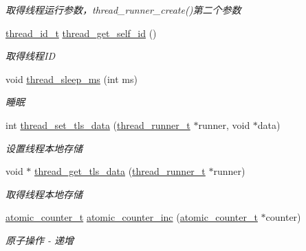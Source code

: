 \begin{DoxyCompactItemize}
\begin{DoxyCompactList}\small\item\em 取得线程运行参数，thread\+\_\+runner\+\_\+create()第二个参数 \end{DoxyCompactList}\item 
\hyperlink{a00050_ad0ada5642d10ce71bdd90816182f9b79_ad0ada5642d10ce71bdd90816182f9b79}{thread\+\_\+id\+\_\+t} \hyperlink{a00107_gaecf10907eee00ec0e807271c906a6645_gaecf10907eee00ec0e807271c906a6645}{thread\+\_\+get\+\_\+self\+\_\+id} ()
\begin{DoxyCompactList}\small\item\em 取得线程\+I\+D \end{DoxyCompactList}\item 
void \hyperlink{a00107_gabddf3ac30aac3f22f8c53b7517e6eb35_gabddf3ac30aac3f22f8c53b7517e6eb35}{thread\+\_\+sleep\+\_\+ms} (int ms)
\begin{DoxyCompactList}\small\item\em 睡眠 \end{DoxyCompactList}\item 
int \hyperlink{a00107_gaa187b2cd2c906680890fb4ea2833d665_gaa187b2cd2c906680890fb4ea2833d665}{thread\+\_\+set\+\_\+tls\+\_\+data} (\hyperlink{a00050_a9054159cde2f926ef61c28ce1e555199_a9054159cde2f926ef61c28ce1e555199}{thread\+\_\+runner\+\_\+t} $\ast$runner, void $\ast$data)
\begin{DoxyCompactList}\small\item\em 设置线程本地存储 \end{DoxyCompactList}\item 
void $\ast$ \hyperlink{a00107_ga63c9be5b8fb04c0b26382f51b7bdf237_ga63c9be5b8fb04c0b26382f51b7bdf237}{thread\+\_\+get\+\_\+tls\+\_\+data} (\hyperlink{a00050_a9054159cde2f926ef61c28ce1e555199_a9054159cde2f926ef61c28ce1e555199}{thread\+\_\+runner\+\_\+t} $\ast$runner)
\begin{DoxyCompactList}\small\item\em 取得线程本地存储 \end{DoxyCompactList}\item 
\hyperlink{a00050_a0d043bbb6b8db19fea54ab9271d352b6_a0d043bbb6b8db19fea54ab9271d352b6}{atomic\+\_\+counter\+\_\+t} \hyperlink{a00107_gade4f41f1cd519f2719b5114ce7801232_gade4f41f1cd519f2719b5114ce7801232}{atomic\+\_\+counter\+\_\+inc} (\hyperlink{a00050_a0d043bbb6b8db19fea54ab9271d352b6_a0d043bbb6b8db19fea54ab9271d352b6}{atomic\+\_\+counter\+\_\+t} $\ast$counter)
\begin{DoxyCompactList}\small\item\em 原子操作 -\/ 递增 \end{DoxyCompactList}\item 

\end{DoxyCompactItemize}
